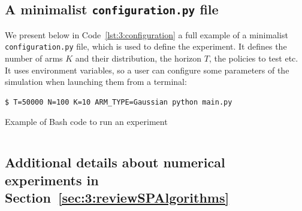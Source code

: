 \subsection{A minimalist \texttt{configuration.py} file}
\label{sub:3:miniConfigurationFileSMPyBandits}

We present below in Code~\ref{lst:3:configuration} a full example of a minimalist \texttt{configuration.py} file,
which is used to define the experiment.
It defines the number of arms $K$ and their distribution, the horizon $T$, the policies to test etc.
It uses environment variables, so a user can configure some parameters of the simulation when launching them from a terminal:


\begin{listing}[h!]
    \begin{verbatim}
$ T=50000 N=100 K=10 ARM_TYPE=Gaussian python main.py
    \end{verbatim}
    \caption{Example of Bash code to run an experiment}
    \label{lst:3:howToRunExperiment2}
\end{listing}

\begin{small}
    \inputminted[linenos=true,numbersep=5pt,frame=lines,framesep=2mm]{python3}{2-Chapters/3-Chapter/src/example_of_configuration_singleplayer.py}
\end{small}


\subsection{Additional details about numerical experiments in Section~\ref{sec:3:reviewSPAlgorithms}}
\label{sub:3:additionalExperiments}

